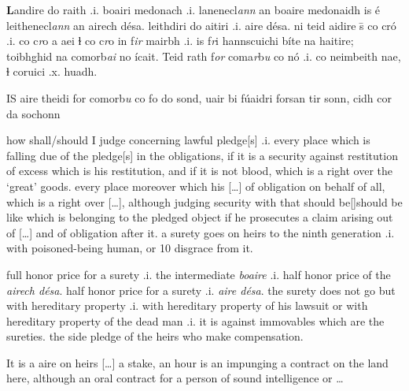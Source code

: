 \documentclass[11pt]{article}
\begin{document}
\begin{pages}
\begin{Leftside}
    \pstart
    \textbf{L}andire do raith .i. boairi medonach .i. lanenecl\emph{ann} an boaire medonaidh is \'{e} leithenecl\emph{ann} an airech d\'{e}sa. leithdiri do aitiri .i. aire d\'{e}sa. ni teid aidire \={s} co cr\'{o} .i. co c\emph{r}o a aei ɫ co c\emph{r}o in f\emph{ir} mairbh .i. is f\emph{r}i hannscuichi b\'{i}te na haitire; toibhghid na comorb\emph{ai} no \'{i}cait. Teid rath f\emph{or} coma\emph{r}b\emph{u} co  n\'{o} .i. co neimbeith nae, ɫ coruici .x. huadh.
    \pend
    
    \pstart
    IS aire theidi for comorb\emph{u} co fo do sond, uair bi f\'{u}aidri forsan tir sonn, cidh cor da sochonn  
    \pend
    \endnumbering
  \end{Leftside}

\begin{Rightside}
    \beginnumbering
   \pstart
   how shall/should I judge concerning lawful pledge[s] .i. every place which is falling due of the pledge[s] in the obligations, if it is a security against restitution of excess which is his restitution, and if it is not blood, which is a right over the `great' goods. every place moreover which his [\ldots] of obligation on behalf of all, which is a right over [\ldots], although judging security with that should be[\hspace{2mm}]should be like which is belonging to the pledged object if he prosecutes a claim arising out of [\ldots] and of obligation after it.  a surety goes on heirs to the ninth generation .i. with poisoned-being human, or 10 disgrace from it.
    \pend

    \pstart
    full honor price for a surety .i. the intermediate \emph{boaire} .i. half honor price of the \emph{airech d\'{e}sa}. half honor price for a surety .i. \emph{aire d\'{e}sa}. the surety does not go but with hereditary property .i. with hereditary property of his lawsuit or with hereditary property of the dead man .i. it is against immovables which are the sureties. the side pledge of the heirs who make compensation. 
    \pend

    \pstart
    It is a aire on heirs [\ldots] a stake, an hour is an impunging a contract on the land here, although an oral contract for a person of sound intelligence or \ldots
    \pend
    \endnumbering
  \end{Rightside}
  \Pages
\end{pages}
\end{document}

